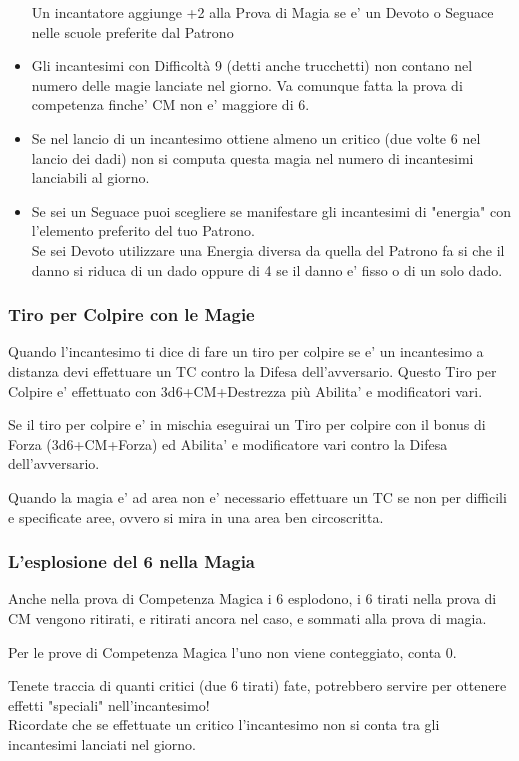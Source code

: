 \begin{itemize}
Un incantatore aggiunge +2 alla Prova di Magia se e' un Devoto o Seguace nelle scuole preferite dal Patrono
\item
Gli incantesimi con Difficoltà 9 (detti anche trucchetti) non contano nel numero delle magie lanciate nel giorno. Va comunque fatta la prova di competenza finche' CM non e' maggiore di 6.
\item
Se nel lancio di un incantesimo ottiene almeno un critico (due volte 6 nel lancio dei dadi) non si computa questa magia nel numero di incantesimi lanciabili al giorno.
\item
Se sei un Seguace puoi scegliere se manifestare gli incantesimi di "energia" con l'elemento preferito del tuo Patrono.\\
Se sei Devoto utilizzare una Energia diversa da quella del Patrono fa si che il danno si riduca di un dado oppure di 4 se il danno e' fisso o di un solo dado.
\end{itemize}

\subsubsection{Tiro per Colpire con le Magie}

Quando l'incantesimo ti dice di fare un tiro per colpire se e' un incantesimo a distanza devi effettuare un TC contro la Difesa dell'avversario. Questo Tiro per Colpire e' effettuato con 3d6+CM+Destrezza più Abilita' e modificatori vari.

Se il tiro per colpire e' in mischia eseguirai un Tiro per colpire con il bonus di Forza (3d6+CM+Forza) ed Abilita' e modificatore vari contro la Difesa dell'avversario.

Quando la magia e' ad area non e' necessario effettuare un TC se non per difficili e specificate aree, ovvero si mira in una area ben circoscritta.

\subsubsection{L'esplosione del 6 nella Magia}

Anche nella prova di Competenza Magica i 6 esplodono, i 6 tirati nella prova di CM vengono ritirati, e ritirati ancora nel caso, e sommati alla prova di magia.

Per le prove di Competenza Magica l'uno non viene conteggiato, conta 0.

Tenete traccia di quanti critici (due 6 tirati) fate, potrebbero servire per ottenere effetti "speciali" nell'incantesimo!\\
Ricordate che se effettuate un critico l'incantesimo non si conta tra gli incantesimi lanciati nel giorno.

